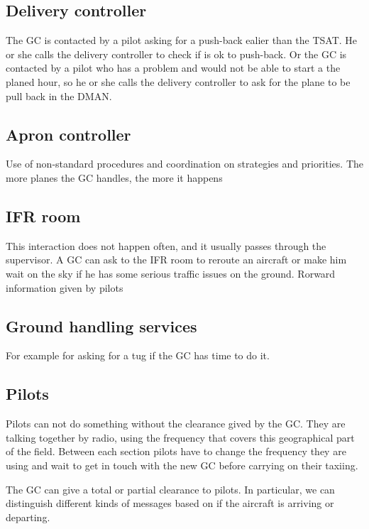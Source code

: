 \documentclass{article}
\begin{document}
\subsection{Delivery controller}
The GC is contacted by a pilot asking for a push-back ealier than the TSAT. He or she calls the delivery controller to check if is ok to push-back. Or the GC is contacted by a pilot who has a problem and would not be able to start a the planed hour, so he or she calls the delivery controller to ask for the plane to be pull back in the DMAN.

\subsection{Apron controller}
Use of non-standard procedures and coordination on strategies and priorities. The more planes the GC handles, the more it happens

\subsection{IFR room}
This interaction does not happen often, and it usually passes through the supervisor. A GC can ask to the IFR room to reroute an aircraft or make him wait on the sky if he has some serious traffic issues on the ground. Rorward information given by pilots

\subsection{Ground handling services}
For example for asking for a tug if the GC has time to do it.

\subsection{Pilots}
Pilots can not do something without the clearance gived by the GC. 
They are talking together by radio, using the frequency that covers this geographical part of the field. Between each section pilots have to change the frequency they are using and wait to get in touch with the new GC before carrying on their taxiing. 

The GC can give a total or partial clearance to pilots. In particular, we can distinguish different kinds of messages based on if the aircraft is arriving or departing.
\end{document}
